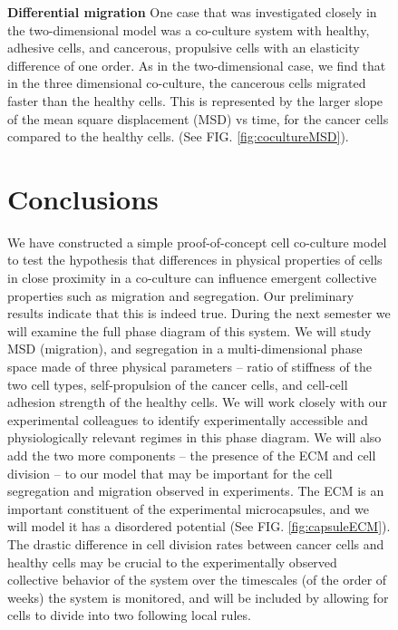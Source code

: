 \documentclass[aps,prb,twocolumn,groupedaddress,nofootinbib,floatfix]{revtex4}
\begin{document}
\begin{figure}
{\bf Differential migration}
One case that was investigated closely in the two-dimensional model was a co-culture system with healthy, adhesive cells, and cancerous, propulsive cells with an elasticity 
difference of one order. As in the two-dimensional case, we find that in the three dimensional co-culture, the cancerous cells migrated faster than the healthy cells. This is represented by the larger
slope of the mean square displacement (MSD) vs time, for the cancer cells compared to the healthy cells. (See FIG. \ref{fig:cocultureMSD}).

\section*{Conclusions}
We have constructed a simple proof-of-concept cell co-culture model to test the hypothesis that differences in physical properties of cells in close proximity in a co-culture can influence emergent collective properties such as migration
and segregation. Our preliminary results indicate that this is indeed true. During the next semester we will examine the full phase diagram of this system. We will study MSD (migration), and segregation in a multi-dimensional phase space
made of three physical parameters -- ratio of stiffness of the two cell types, self-propulsion of the cancer cells, and cell-cell adhesion strength of the healthy cells. We will work closely with our experimental colleagues to identify experimentally
accessible and physiologically relevant regimes in this phase diagram. We will also add the two more components -- the presence of the ECM and cell division -- to our model that may be important for the cell segregation and migration observed in experiments. The ECM is an important constituent of the experimental microcapsules, and we will model it has a disordered potential  (See FIG. \ref{fig:capsuleECM}). The drastic difference in cell division rates between cancer cells and healthy cells may be crucial to the experimentally observed collective behavior of the system over the timescales (of the order of weeks) the system is monitored, and will be included by allowing for cells to divide into two following local rules. 


\end{figure}
\end{document}
